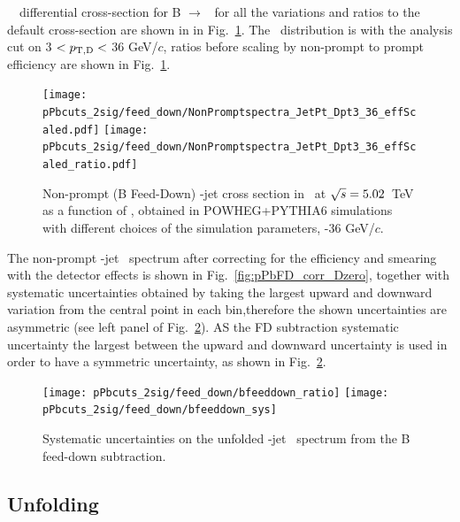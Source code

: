 \ptchjet\ \pt\ differential cross-section for B $\rightarrow$ \Dzero\ for all the variations and ratios to the default cross-section are shown in  in Fig.~\ref{fig:BFeedDown_JetPtSpectrum_Dzero}.
The \ptchjet\ distribution is with the analysis cut on 3 $< p_{\mathrm{T,D}} <$ 36 GeV/$c$, ratios before scaling by non-prompt to prompt efficiency are shown in Fig.~\ref{fig:BFeedDown_JetPtSpectrum_Dzero}.


\begin{figure}[bth]
\begin{center}
\texttt{[image: pPbcuts\_2sig/feed\_down/NonPromptspectra\_JetPt\_Dpt3\_36\_effScaled.pdf]}
\texttt{[image: pPbcuts\_2sig/feed\_down/NonPromptspectra\_JetPt\_Dpt3\_36\_effScaled\_ratio.pdf]}
\caption{Non-prompt (B Feed-Down) \Dzero-jet cross section in \pp\ at $\sqrt{s}=5.02$~TeV as a function of \ptchjet, obtained in POWHEG+PYTHIA6 simulations with different choices of the simulation parameters, \ptd{}-36 GeV/$c$.} 
\label{fig:BFeedDown_JetPtSpectrum_Dzero}
\end{center}
\end{figure}

The non-prompt \Dzero-jet \pt\ spectrum after correcting for the efficiency and smearing with the detector effects is shown in Fig.~\ref{fig:pPbFD_corr_Dzero}, together with systematic uncertainties obtained by taking the largest upward and downward variation from the central point in each bin,therefore the shown uncertainties are asymmetric (see left panel of Fig.~\ref{fig:BFeedDown_sysUnc_Dzero}). AS the FD subtraction systematic uncertainty the largest between the upward and downward uncertainty is used in order to have a symmetric uncertainty, as shown in Fig.~\ref{fig:BFeedDown_sysUnc_Dzero}.

\begin{figure}[bth]
\begin{center}
\texttt{[image: pPbcuts\_2sig/feed\_down/bfeeddown\_ratio]}
\texttt{[image: pPbcuts\_2sig/feed\_down/bfeeddown\_sys]}
\caption{Systematic uncertainties on the unfolded \Dzero-jet \pt\ spectrum from the B feed-down subtraction.} 
\label{fig:BFeedDown_sysUnc_Dzero}
\end{center}
\end{figure}


\subsection{Unfolding}
\label{sUnfoldSys}

